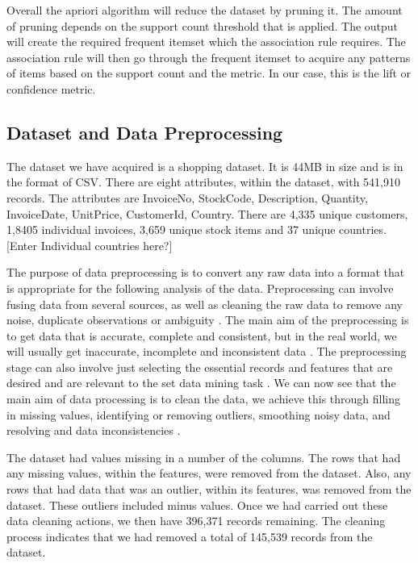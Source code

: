 \documentclass[a4paper,10pt]{article}
\begin{document}
Overall the apriori algorithm will reduce the dataset by pruning it. The amount of pruning depends on the support count threshold that is applied. The output will create the required frequent itemset which the association rule requires. The association rule will then go through the frequent itemset to acquire any patterns of items based on the support count and the metric. In our case, this is the lift or confidence metric.

\subsection{Dataset and Data Preprocessing}

The dataset we have acquired is a shopping dataset. It is 44MB in size and is in the format of CSV. There are eight attributes, within the dataset, with 541,910 records. The attributes are InvoiceNo, StockCode, Description, Quantity, InvoiceDate, UnitPrice, CustomerId, Country. There are 4,335 unique customers, 1,8405 individual invoices, 3,659 unique stock items and 37 unique countries. [Enter Individual countries here?]

The purpose of data preprocessing is to convert any raw data into a format that is appropriate for the following analysis of the data. Preprocessing can involve fusing data from several sources, as well as cleaning the raw data to remove any noise, duplicate observations or ambiguity \cite{tan2016introduction}. The main aim of the preprocessing is to get data that is accurate, complete and consistent, but in the real world, we will usually get inaccurate, incomplete and inconsistent data \cite{han2011data}. The preprocessing stage can also involve just selecting the essential records and features that are desired and are relevant to the set data mining task \cite{tan2016introduction}. We can now see that the main aim of data processing is to clean the data, we achieve this through filling in missing values, identifying or removing outliers, smoothing noisy data, and resolving and data inconsistencies \cite{han2011data}.

The dataset had values missing in a number of the columns. The rows that had any missing values, within the features, were removed from the dataset. Also, any rows that had data that was an outlier, within its features, was removed from the dataset. These outliers included minus values. Once we had carried out these data cleaning actions, we then have 396,371 records remaining. The cleaning process indicates that we had removed a total of 145,539 records from the dataset. 
\end{document}
